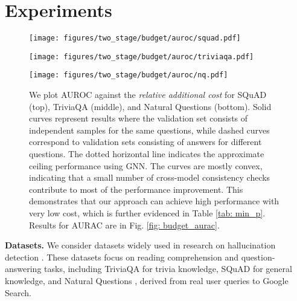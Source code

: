 
\section{Experiments}\label{sec: exp}



\begin{figure*}[!t]
    \centering
    \texttt{[image: figures/two\_stage/budget/auroc/squad.pdf]}
    
    \texttt{[image: figures/two\_stage/budget/auroc/triviaqa.pdf]}

    \texttt{[image: figures/two\_stage/budget/auroc/nq.pdf]}
    \vspace{-.2cm}
    \caption{ We plot AUROC against the \emph{relative additional cost} for SQuAD (top), TriviaQA (middle), and Natural Questions (bottom). Solid curves represent results where the validation set consists of independent samples for the same questions, while dashed curves correspond to validation sets consisting of answers for different questions. The dotted horizontal line indicates the approximate ceiling performance using GNN. The curves are mostly convex, indicating that a small number of cross-model consistency checks contribute to most of the performance improvement. This demonstrates that our approach can achieve high performance with very low cost, which is further evidenced in Table \ref{tab: min_p}.
    Results for AURAC are in Fig. \ref{fig: budget_aurac}. 
     }
    \label{fig: budget_auroc}
    \vspace{-.2cm}
\end{figure*}



\textbf{Datasets.} We consider datasets widely used in research on hallucination detection \cite{kuhn2023semantic,farquhar2024detecting,lin2023generating,nikitin2024kernel}. These datasets focus on reading comprehension and question-answering tasks, including TriviaQA \cite{2017arXivtriviaqa} for trivia knowledge, SQuAD \cite{rajpurkar-etal-2016-squad} for general knowledge, and Natural Questions \cite{47761}, derived from real user queries to Google Search. 

